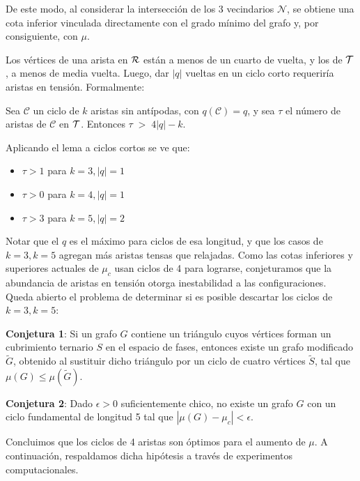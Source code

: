  De este modo, al considerar la intersección de los 3 vecindarios $\mathcal{N}$, se obtiene una cota inferior vinculada directamente con el grado mínimo del grafo y, por consiguiente, con $\mu$. 



Los vértices de una arista en $\mathcal{R}$ están a menos de un cuarto de vuelta, y los de $\mathcal{T}$, a menos de media vuelta. Luego, dar $|q|$ vueltas en un ciclo corto requeriría aristas en tensión. Formalmente:

\begin{lema}[]\label{lema:long}
Sea \(\mathcal{C}\) un ciclo de $k$ aristas sin antípodas, con $q(\mathcal{C})=q$, y sea $\tau$ el número de aristas de \(\mathcal{C}\) en $\mathcal{T}$. Entonces 
$\tau\;>\;4|q|-k$.
\end{lema}

Aplicando el lema a ciclos cortos se ve que:
\begin{itemize}
    \item \( \tau > 1\) para \( k = 3, |q| = 1\)
    \item \( \tau > 0\) para \( k = 4, |q| = 1\)
    \item \( \tau > 3\) para \( k = 5, |q| = 2\)
\end{itemize}
Notar que el \(q\) es el máximo para ciclos de esa longitud, y que los casos de  \(k =3, k=5\) agregan más aristas tensas que relajadas. Como las cotas inferiores y superiores actuales de \(\mu_c\) usan ciclos de 4 para lograrse, conjeturamos que la abundancia de aristas en tensión otorga inestabilidad a las configuraciones. Queda abierto el problema de determinar si es posible descartar los ciclos de \(k =3, k=5\):

\vspace{1em}

\begin{eqbox}
\textbf{Conjetura 1}: Si un grafo $G$ contiene un triángulo cuyos vértices forman un cubrimiento ternario $S$ en el espacio de fases, entonces existe un grafo modificado $\tilde{G}$, obtenido al sustituir dicho triángulo por un ciclo de cuatro vértices $\tilde{S}$, tal que $\mu(G) \le \mu(\tilde{G})$.

\textbf{Conjetura 2}: Dado \( \epsilon > 0\) suficientemente chico, no existe un grafo $G$ con un ciclo fundamental de longitud 5 tal que $|\mu(G) - \mu_c| < \epsilon$.
\end{eqbox}

\vspace{1em}

Concluimos que los ciclos de 4 aristas son óptimos para el aumento de \(\mu\). A continuación, respaldamos dicha hipótesis a través de experimentos computacionales.  